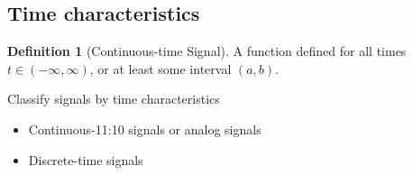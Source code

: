 \documentclass{article}
\theoremstyle{definition}
\newtheorem{definition}{Definition}[subsection]
\begin{document}
\subsection{Time characteristics}
\begin{definition}[Continuous-time Signal]
    A function defined for all times $ t \in (-\infty,\infty) $, or at least some interval $ (a,b) $.
\end{definition}
Classify signals by time characteristics
\begin{itemize}
    \item Continuous-11:10 signals or analog signals
    \item Discrete-time signals
\end{itemize}
\end{document}
